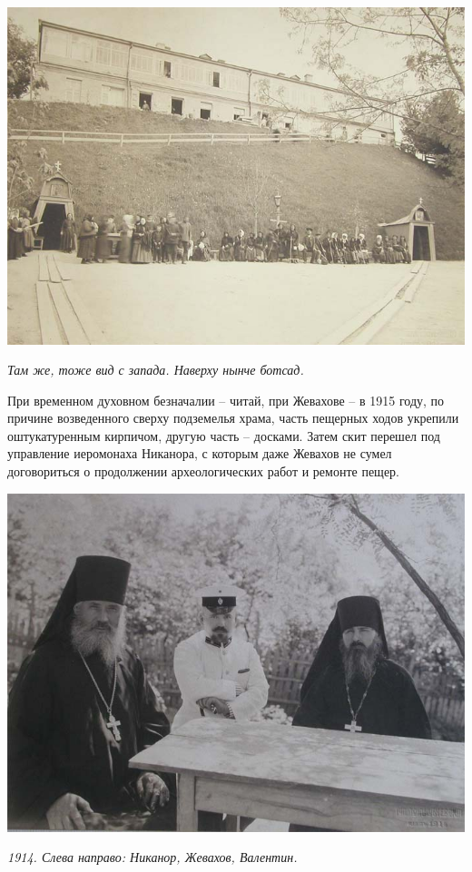 \begin{center}
\includegraphics[width=\linewidth]{chast-colebanie-osnov/nachalo/1914-szap.jpg}

\textit{Там же, тоже вид с запада. Наверху нынче ботсад.}
\end{center}
\vspace*{\fill}
\newpage

При временном духовном безначалии – читай, при Жевахове – в 1915 году, по причине возведенного сверху подземелья храма, часть пещерных ходов укрепили оштукатуренным кирпичом, другую часть – досками. Затем скит перешел под управление иеромонаха Никанора, с которым даже Жевахов не сумел договориться о продолжении археологических работ и ремонте пещер. 

\begin{center}
\includegraphics[width=0.90\linewidth]{chast-colebanie-osnov/nachalo/1914-nikanor.jpg}

\textit{1914. Слева направо: Никанор, Жевахов, Валентин.}
\end{center}

